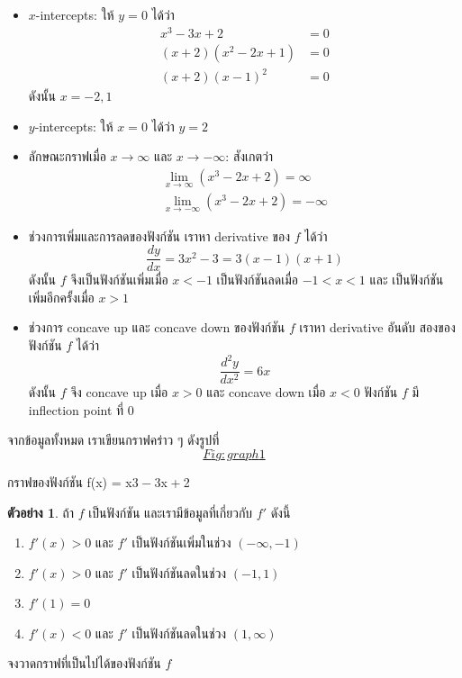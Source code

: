 \documentclass[
]{book}
\theoremstyle{definition}
\theoremstyle{definition}
\newtheorem{example}{ตัวอย่าง}[chapter]
\theoremstyle{definition}
\theoremstyle{definition}
\theoremstyle{remark}
\begin{document}
\begin{itemize}
\item
  \(x\)-intercepts: ให้ \(y=0\) ได้ว่า \begin{equation}   \begin{aligned}
      x^3-3x+2 &= 0 \\
      (x+2)(x^2-2x+1) &= 0 \\
      (x+2)(x-1)^2 &= 0
    \end{aligned} \end{equation} ดังนั้น \(x=-2, 1\)
\item
  \(y\)-intercepts: ให้ \(x=0\) ได้ว่า \(y=2\)
\item
  ลักษณะกราฟเมื่อ \(x \to \infty\) และ \(x \to -\infty\): สังเกตว่า
  \begin{equation}   \begin{aligned}
      \lim_{x\to \infty} (x^3-2x+2) = \infty \\
      \lim_{x\to -\infty} (x^3-2x+2) = -\infty
    \end{aligned} \end{equation}
\item
  ช่วงการเพิ่มและการลดของฟังก์ชัน เราหา derivative ของ \(f\) ได้ว่า
  \[\frac{dy}{dx} = 3x^2-3 = 3(x-1)(x+1)\] ดังนั้น \(f\) จึงเป็นฟังก์ชันเพิ่มเมื่อ
  \(x < -1\) เป็นฟังก์ชันลดเมื่อ \(-1 < x < 1\) และ เป็นฟังก์ชันเพิ่มอีกครั้งเมื่อ \(x>1\)
\item
  ช่วงการ concave up และ concave down ของฟังก์ชัน \(f\) เราหา derivative
  อันดับ สองของฟังก์ชัน \(f\) ได้ว่า \[\frac{d^2y}{dx^2} = 6x\] ดังนั้น \(f\) จึง
  concave up เมื่อ \(x>0\) และ concave down เมื่อ \(x<0\) ฟังก์ชัน \(f\) มี
  inflection point ที่ \(0\)
\end{itemize}

จากข้อมูลทั้งหมด เราเขียนกราฟคร่าว ๆ
ดังรูปที่~\hyperref[Fig:graph1]{\[Fig:graph1\]}

กราฟของฟังก์ชัน {f(x) = x3 − 3x + 2}

\begin{example}
ถ้า \(f\) เป็นฟังก์ชัน และเรามีข้อมูลที่เกี่ยวกับ \(f'\) ดังนี้

\begin{enumerate}
\def\labelenumi{\arabic{enumi}.}
\item
  \(f'(x) > 0\) และ \(f'\) เป็นฟังก์ชันเพิ่มในช่วง \((-\infty, -1)\)
\item
  \(f'(x) > 0\) และ \(f'\) เป็นฟังก์ชันลดในช่วง \((-1,1)\)
\item
  \(f'(1) = 0\)
\item
  \(f'(x) < 0\) และ \(f'\) เป็นฟังก์ชันลดในช่วง \((1,\infty)\)
\end{enumerate}

จงวาดกราฟที่เป็นไปได้ของฟังก์ชัน \(f\)
\end{example}
\end{document}
